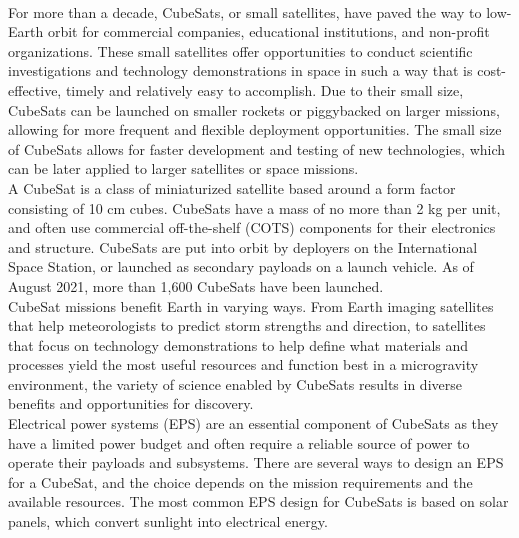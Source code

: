 \\

For more than a decade, CubeSats, or small satellites, have paved the way to
low-Earth orbit for commercial companies, educational institutions, and non-profit
organizations. These small satellites offer opportunities to conduct scientific
investigations and technology demonstrations in space in such a way that is
cost-effective, timely and relatively easy to accomplish. Due to their small size, CubeSats can be launched on smaller rockets or piggybacked on larger missions, allowing for more frequent and flexible deployment opportunities. The small size of CubeSats allows for faster development and testing of new technologies, which can be later applied to larger satellites or space missions.\\


A CubeSat is a class of miniaturized satellite based around a form factor consisting
of 10 cm cubes. CubeSats have a mass of no more than 2 kg per unit, and often use
commercial off-the-shelf (COTS) components for their electronics and structure.
CubeSats are put into orbit by deployers on the International Space Station, or
launched as secondary payloads on a launch vehicle. As of August 2021, more than
1,600 CubeSats have been launched.
\\

CubeSat missions benefit Earth in varying ways. From Earth imaging satellites that
help meteorologists to predict storm strengths and direction, to satellites that focus
on technology demonstrations to help define what materials and processes yield the
most useful resources and function best in a microgravity environment, the variety
of science enabled by CubeSats results in diverse benefits and opportunities for
discovery.\\

Electrical power systems (EPS) are an essential component of CubeSats as they have a limited power budget and often require a reliable source of power to operate their payloads and subsystems. There are several ways to design an EPS for a CubeSat, and the choice depends on the mission requirements and the available resources.
The most common EPS design for CubeSats is based on solar panels, which convert sunlight into electrical energy. 

